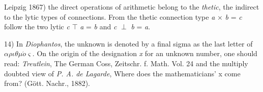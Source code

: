 \vfill
\leftline{\rule{2in}{0.4pt}}
\vspace{0.2cm}
{
\footnotesize
Leipzig 1867) the direct operations of arithmetic belong to the \textit{thetic}, the indirect to the lytic types of connections. From the thetic connection type \textit{a} × \textit{b} = \textit{c} follow the two lytic \textit{c} $\top$ \textit{a} = \textit{b} and \textit{c} $\perp$ \textit{b} = \textit{a}.

14) In \textit{Diophantos}, the unknown is denoted by a final sigma as the last letter of $\alpha\rho\iota\theta\mu\acute{o}\varsigma$. On the origin of the designation \textit{x} for an unknown number, one should read: \textit{Treutlein}, The German Coss, Zeitschr. f. Math. Vol. 24 and the multiply doubted view of \textit{P. A. de Lagarde}, Where does the mathematicians' x come from? (Gött. Nachr., 1882).

}
